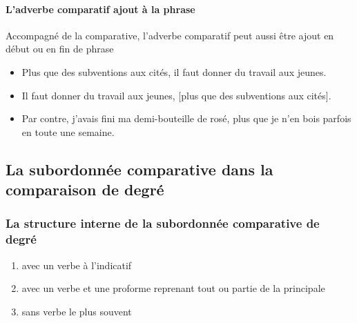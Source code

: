 \documentclass[UTF8]{report}
\begin{document}
\paragraph{L’adverbe comparatif ajout à la phrase}
Accompagné de la comparative, l’adverbe comparatif peut aussi être ajout en début ou en fin de phrase
\begin{itemize}
    \item Plus que des subventions aux cités, il faut donner du travail aux jeunes.
    \item Il faut donner du travail aux jeunes, [plus que des subventions aux cités].
    \item Par contre, j’avais fini ma demi-bouteille de rosé, plus que je n’en bois parfois en toute une semaine.
\end{itemize}



\subsection{La subordonnée comparative dans la comparaison de degré}

\subsubsection{La structure interne de la subordonnée comparative de degré}
\begin{enumerate}
    \item avec un verbe à l’indicatif
    \item avec un verbe et une proforme reprenant tout ou partie de la principale
    \item sans verbe le plus souvent
\end{enumerate}
\end{document}
